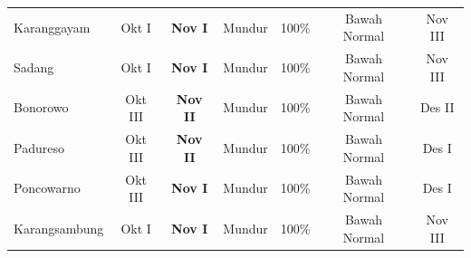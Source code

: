 {\begin{tabular}{lcccccc}
Ka\-rang\-ga\-yam & Okt I & \textbf{Nov I} & Mundur & 100\% & Bawah Normal & Nov III \\
Sadang & Okt I & \textbf{Nov I} & Mundur & 100\% & Bawah Normal & Nov III \\
Bonorowo & Okt III & \textbf{Nov II} & Mundur & 100\% & Bawah Normal & Des II \\
Padureso & Okt III & \textbf{Nov II} & Mundur & 100\% & Bawah Normal & Des I \\
Poncowarno & Okt III & \textbf{Nov I} & Mundur & 100\% & Bawah Normal & Des I \\
Ka\-rang\-sam\-bung & Okt I & \textbf{Nov I} & Mundur & 100\% & Bawah Normal & Nov III \\
\hline\hline
\end{tabular}%
}
